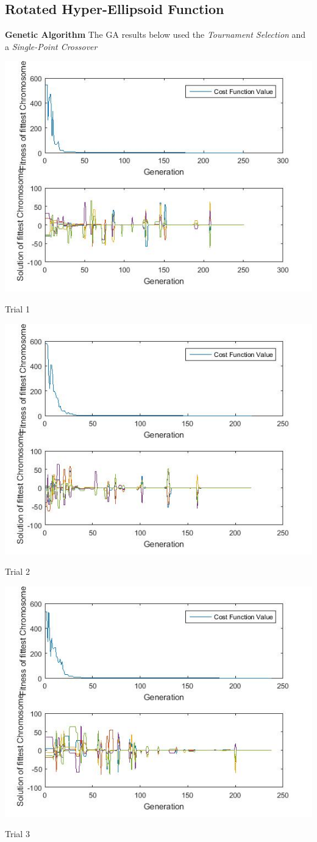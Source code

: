 \documentclass{article}
\begin{document}
\subsection{Rotated Hyper-Ellipsoid Function}
\textbf{Genetic Algorithm} The GA results below used the \textit{Tournament Selection} and a \textit{Single-Point Crossover}\\
\centerline{\includegraphics[width=0.5\linewidth]{ga_tf3_s1_c1a}}
\centerline{Trial 1}
\centerline{\includegraphics[width=0.5\linewidth]{ga_tf3_s1_c1b}}
\centerline{Trial 2}
\centerline{\includegraphics[width=0.5\linewidth]{ga_tf3_s1_c1c}}
\centerline{Trial 3}
\end{document}
